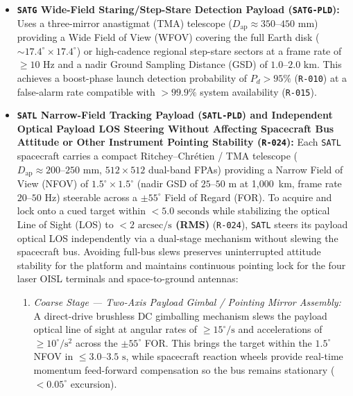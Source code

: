 \documentclass[11pt,a4paper]{article}
\providecommand{\abbr}[1]{#1}
\begin{document}
\begin{itemize}
    \item \textbf{\texttt{SATG} Wide-Field Staring/Step-Stare Detection Payload (\texttt{SATG-PLD}):} Uses a three-mirror anastigmat (TMA) telescope ($D_{\text{ap}} \approx 350\text{--}450\text{ mm}$) providing a Wide Field of View (\abbr{WFOV}) covering the full Earth disk ($\sim 17.4^\circ \times 17.4^\circ$) or high-cadence regional step-stare sectors at a frame rate of $\ge 10\text{ Hz}$ and a nadir Ground Sampling Distance (\abbr{GSD}) of $1.0\text{--}2.0\text{ km}$. This achieves a boost-phase launch detection probability of $P_d > 95\%$ (\texttt{R-010}) at a false-alarm rate compatible with $> 99.9\%$ system availability (\texttt{R-015}).
    \item \textbf{\texttt{SATL} Narrow-Field Tracking Payload (\texttt{SATL-PLD}) and Independent Optical Payload \abbr{LOS} Steering Without Affecting Spacecraft Bus Attitude or Other Instrument Pointing Stability (\texttt{R-024}):} Each \texttt{SATL} spacecraft carries a compact Ritchey--Chr\'{e}tien / TMA telescope ($D_{\text{ap}} \approx 200\text{--}250\text{ mm}$, $512 \times 512$ dual-band \abbr{FPA}s) providing a Narrow Field of View (\abbr{NFOV}) of $1.5^\circ \times 1.5^\circ$ (nadir \abbr{GSD} of $25\text{--}50\text{ m}$ at 1,000~km, frame rate $20\text{--}50\text{ Hz}$) steerable across a $\pm 55^\circ$ Field of Regard (\abbr{FOR}). To acquire and lock onto a cued target within \textbf{$< 5.0\text{ seconds}$} while stabilizing the optical Line of Sight (\abbr{LOS}) to \textbf{$< 2\text{ arcsec/s}$ (RMS)} (\texttt{R-024}), \texttt{SATL} steers its payload optical \abbr{LOS} independently via a dual-stage mechanism without slewing the spacecraft bus. Avoiding full-bus slews preserves uninterrupted attitude stability for the platform and maintains continuous pointing lock for the four laser \abbr{OISL} terminals and space-to-ground antennas:
    \begin{enumerate}
        \item \emph{Coarse Stage --- Two-Axis Payload Gimbal / Pointing Mirror Assembly:} A direct-drive brushless DC gimballing mechanism slews the payload optical line of sight at angular rates of $\ge 15^\circ/\text{s}$ and accelerations of $\ge 10^\circ/\text{s}^2$ across the $\pm 55^\circ$ \abbr{FOR}. This brings the target within the $1.5^\circ$ \abbr{NFOV} in $\le 3.0\text{--}3.5\text{ s}$, while spacecraft reaction wheels provide real-time momentum feed-forward compensation so the bus remains stationary ($< 0.05^\circ$ excursion).

\end{enumerate}
\end{itemize}
\end{document}
